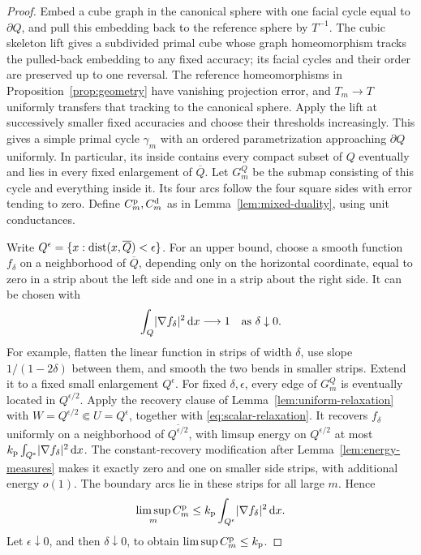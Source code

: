 \begin{proof}
Embed a cube graph in the canonical sphere with one facial cycle equal to
\(\partial Q\), and pull this embedding back to the reference sphere by
\(T^{-1}\).  The cubic skeleton lift
\cite[Lemma~4.7]{C} gives a subdivided primal cube whose graph
homeomorphism tracks the pulled-back embedding to any fixed accuracy; its facial
cycles and their order are preserved up to one reversal.
The reference homeomorphisms in Proposition~\ref{prop:geometry} have
vanishing projection error, and \(T_m\to T\) uniformly transfers that
tracking to the canonical sphere.  Apply the lift at successively smaller fixed
accuracies and choose their thresholds increasingly.  This gives a simple
primal cycle \(\gamma_m\) with an ordered parametrization approaching
\(\partial Q\) uniformly.  In particular, its inside contains every
compact subset of \(Q\) eventually and lies in every fixed enlargement
of \(\overline Q\).  Let \(G_m^Q\) be the submap consisting of this cycle
and everything inside it.  Its four arcs follow the four square sides
with error tending to zero.  Define \(C_m^{\rm p},C_m^{\rm d}\) as in
Lemma~\ref{lem:mixed-duality}, using unit conductances.

Write \(Q^\epsilon=\{x:\operatorname{dist}(x,\overline Q)<\epsilon\}\).  For an upper
bound, choose a smooth function \(f_\delta\) on a neighborhood
of \(\overline Q\), depending only on the horizontal coordinate, equal to
zero in a strip about the left side and one in a strip about the right
side.  It can be chosen with
\[
 \int_Q\lvert \nabla f_\delta\rvert^2\,\mathrm d x\longrightarrow1
 \quad\text{as }\delta\downarrow0.
\]
For example, flatten the linear function in strips of width \(\delta\),
use slope \(1/(1-2\delta)\) between them, and smooth the two bends in
smaller strips.  Extend it to a fixed small enlargement \(Q^\epsilon\).
For fixed \(\delta,\epsilon\), every edge of \(G_m^Q\) is eventually
located in \(Q^{\epsilon/2}\).  Apply the recovery clause of
Lemma~\ref{lem:uniform-relaxation} with
\(W=Q^{\epsilon/2}\Subset U=Q^\epsilon\), together with
\eqref{eq:scalar-relaxation}.  It recovers \(f_\delta\) uniformly on
a neighborhood of \(\overline{Q^{\epsilon/2}}\), with limsup energy
on \(Q^{\epsilon/2}\) at most
\(k_{\rm p}\int_{Q^\epsilon}\lvert \nabla f_\delta\rvert^2\,\mathrm d x\).
The constant-recovery modification after
Lemma~\ref{lem:energy-measures} makes it exactly zero and one on smaller
side strips, with additional energy \(o(1)\).  The boundary arcs lie
in these strips for all large \(m\).  Hence
\[
 \limsup_m C_m^{\rm p}
 \le k_{\rm p}\int_{Q^\epsilon}\lvert \nabla f_\delta\rvert^2\,\mathrm d x.
\]
Let \(\epsilon\downarrow0\), and then \(\delta\downarrow0\), to obtain
\(\limsup C_m^{\rm p}\le k_{\rm p}\).


\end{proof}
